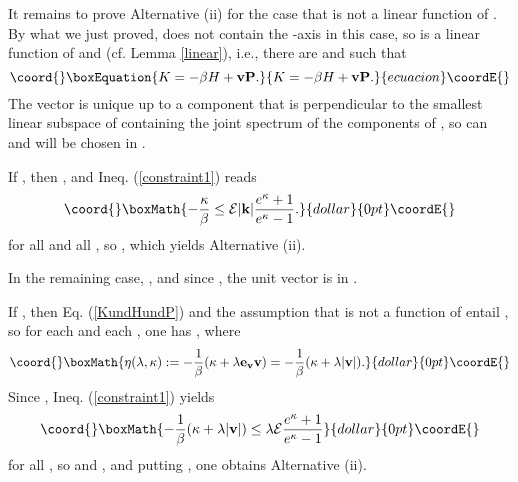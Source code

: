 \documentclass[a4paper,11pt]{article}
\def\E{{\cal E}}
\def\reals{{\bf R}}
\begin{document}
It remains to prove Alternative (ii) for the case that
\coordHE{} is not a linear function of \coordHE{}.
By what we just proved, \coordHE{} does not contain the \myHighlight{$\kappa$}\coordHE{}-axis in this case,
so \coordHE{} is a linear function of \coordHE{} and \coordHE{} (cf. Lemma \ref{linear}),
i.e., there are \myHighlight{$\beta\in\reals$}\coordHE{} and \myHighlight{${\bf v}\in\reals^s$}\coordHE{} such that
\begin{equation}\coord{}\boxEquation{\label{KundHundP}
K=-\beta H+{\bf v}{\bf P}.
}{K=-\beta H+{\bf v}{\bf P}.
}{ecuacion}\coordE{}\end{equation}
The vector \coordHE{} is unique up to a component that is perpendicular
to the smallest linear subspace \coordHE{} of \myHighlight{$\reals^s$}\coordHE{}
containing the joint spectrum of the components of \coordHE{}, so
\coordHE{} can and will be chosen in \coordHE{}.

If \coordHE{}, then
\coordHE{}, and Ineq. (\ref{constraint1}) reads
$$\coord{}\boxMath{-\frac{\kappa}{\beta}\leq\E|{\bf k}|\frac{e^\kappa+1}{e^\kappa-1}.}{dollar}{0pt}\coordE{}$$
for all \coordHE{} and all \coordHE{}, so
\coordHE{}, which yields Alternative (ii).

In the remaining case, \coordHE{}, and since \coordHE{},
the unit vector \coordHE{} is in \coordHE{}.

If \coordHE{}, then Eq. (\ref{KundHundP}) and
the assumption that \coordHE{} is not a function of \coordHE{} entail \coordHE{},
so for each \coordHE{} and each \coordHE{},
one has \coordHE{},
where
$$\coord{}\boxMath{\eta(\lambda,\kappa)
:=-\frac{1}{\beta}(\kappa+\lambda {\bf e_v}{\bf v})
 =-\frac{1}{\beta}(\kappa+\lambda|{\bf v}|).}{dollar}{0pt}\coordE{}$$
Since \myHighlight{$X\subset\sigma^{(\E)}$}\coordHE{}, Ineq. (\ref{constraint1}) yields
$$\coord{}\boxMath{-\frac{1}{\beta}(\kappa+
\lambda|{\bf v}|)\leq\lambda\E\frac{e^\kappa+1}{e^\kappa-1}}{dollar}{0pt}\coordE{}$$
for all \coordHE{}, so \coordHE{} and \myHighlight{$|\frac{{\bf v}}{\beta}|\leq\E$}\coordHE{},
and putting \coordHE{}, one obtains Alternative (ii).
\end{document}
